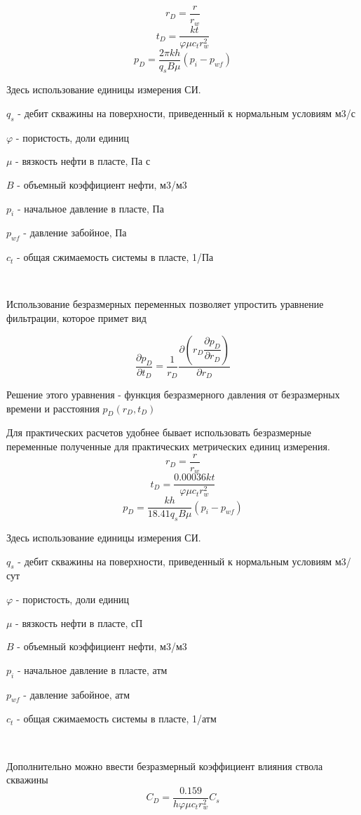 $$ r_D = \frac{r}{r_w} $$
$$ t_D = \frac{kt}{\varphi \mu c_t r_w^2}$$
$$ p_D = \frac{2 \pi kh}{q_s B \mu} \left( p_i - p_{wf} \right) $$

Здесь использование единицы измерения СИ. 

$q_s$ - дебит скважины на поверхности, приведенный к нормальным условиям м3/с

$\varphi$ - пористость, доли единиц

$\mu$ - вязкость нефти в пласте, Па с

$B$ - объемный коэффициент нефти, м3/м3

$p_i$ - начальное давление в пласте, Па

$p_{wf}$ - давление забойное, Па

$c_t$ - общая сжимаемость системы в пласте, 1/Па

\

Использование безразмерных переменных позволяет упростить уравнение фильтрации, которое примет вид

$$ \frac{\partial p_D}{ \partial t_D} = \frac{1}{r_D} \frac{ \partial{ \left( r_D \dfrac{\partial p_D}{ \partial r_D} \right) } }{ \partial{r_D} } $$

Решение этого уравнения - функция безразмерного давления от безразмерных времени и расстояния $p_D(r_D, t_D) $

Для практических расчетов удобнее бывает использовать безразмерные переменные полученные для практических метрических единиц измерения. 
$$ r_D = \frac{r}{r_w} $$
$$ t_D = \frac{0.00036 kt}{\varphi \mu c_t r_w^2}$$
$$ p_D = \frac{kh}{ 18.41 q_s B \mu} \left( p_i - p_{wf} \right) $$

Здесь использование единицы измерения СИ. 

$q_s$ - дебит скважины на поверхности, приведенный к нормальным условиям м3/сут

$\varphi$ - пористость, доли единиц

$\mu$ - вязкость нефти в пласте, сП

$B$ - объемный коэффициент нефти, м3/м3

$p_i$ - начальное давление в пласте, атм

$p_{wf}$ - давление забойное, атм

$c_t$ - общая сжимаемость системы в пласте, 1/атм

\

Дополнительно можно ввести безразмерный коэффициент влияния ствола скважины
$$ C_D = \frac{0.159}{ h \varphi \mu c_t r_w^2 } C_s $$

